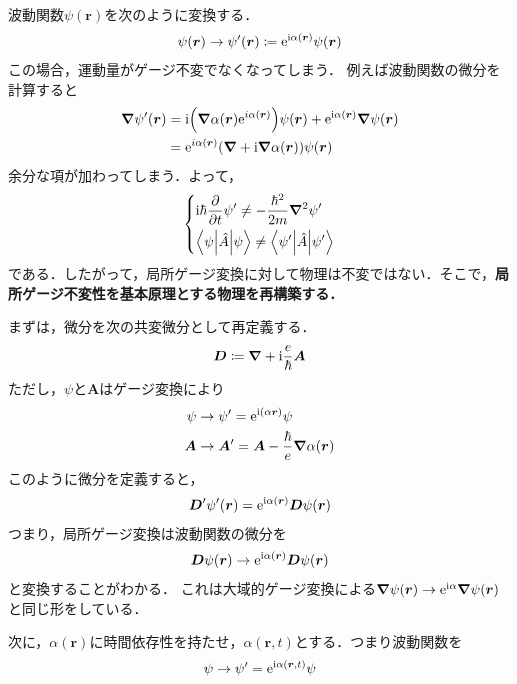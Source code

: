 \documentclass{report}
\begin{document}
  波動関数$\psi(\bm{r})$を次のように変換する．
  \begin{align}
    \psi(\bm{r}) \to \psi'(\bm{r}) \coloneqq \mathrm{e}^{\mathrm{i}\alpha(\bm{r})}\psi(\bm{r})
  \end{align}
  この場合，運動量がゲージ不変でなくなってしまう．
  例えば波動関数の微分を計算すると
  \begin{align}
    \grad\psi'(\bm{r}) &= \mathrm{i}\qty(\grad\alpha(\bm{r})\mathrm{e}^{i\alpha(\bm{r})})\psi(\bm{r}) + \mathrm{e}^{\mathrm{i}\alpha(\bm{r})}\grad\psi(\bm{r}) \\ 
    &= \mathrm{e}^{i\alpha(\bm{r  })}(\grad + \mathrm{i}\grad\alpha(\bm{r}))\psi(\bm{r}) 
  \end{align}
  余分な項が加わってしまう．よって，
  \begin{align}
    \begin{dcases}
      \mathrm{i}\hbar\pdv{t}\psi' \neq -\frac{\hbar^2}{2m}\grad^2\psi'\\
      \mel**{\psi}{\hat{A}}{\psi} \neq \mel**{\psi'}{\hat{A}}{\psi'}
    \end{dcases}
  \end{align}
  である．したがって，局所ゲージ変換に対して物理は不変ではない．そこで，\textbf{局所ゲージ不変性を基本原理とする物理を再構築する．}
  \par
  まずは，微分を次の共変微分として再定義する．
  \begin{align}
    \bm{D} \coloneqq \grad + \mathrm{i}\frac{e}{\hbar}\bm{A}
  \end{align}
  ただし，$\psi$と$\bm{A}$はゲージ変換により
  \begin{align}
    \psi &\to \psi' = \mathrm{e}^{\mathrm{i}(\alpha{\bm{r}})}\psi\\
    \bm{A} &\to \bm{A}' = \bm{A} - \frac{\hbar}{e}\grad\alpha(\bm{r})
  \end{align}
  このように微分を定義すると，
  \begin{align}
    \bm{D}'\psi'(\bm{r}) = \mathrm{e}^{\mathrm{i}\alpha(\bm{r})}\bm{D}\psi(\bm{r})
  \end{align}
  つまり，局所ゲージ変換は波動関数の微分を
  \begin{align}
    \bm{D}\psi(\bm{r}) \to \mathrm{e}^{\mathrm{i}\alpha(\bm{r})}\bm{D}\psi(\bm{r})
  \end{align}
  と変換することがわかる．
  これは大域的ゲージ変換による$\grad\psi(\bm{r}) \to \mathrm{e}^{\mathrm{i}\alpha}\grad\psi(\bm{r})$と同じ形をしている．
  \par
  次に，$\alpha(\bm{r})$に時間依存性を持たせ，$\alpha(\bm{r},t)$とする．つまり波動関数を
  \begin{align}
    \psi \to \psi' = \mathrm{e}^{\mathrm{i}\alpha(\bm{r},t)}\psi
  \end{align}
\end{document}
